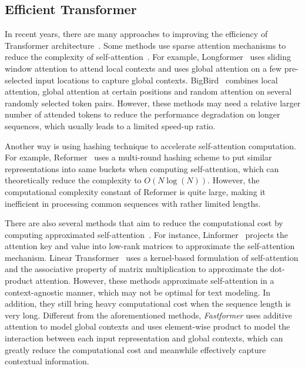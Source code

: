 \documentclass[11pt,a4paper]{article}
\begin{document}
\subsection{Efficient Transformer}

In recent years, there are many approaches to improving the efficiency of Transformer architecture~\cite{tay2020efficient}.
Some methods use sparse attention mechanisms to reduce the complexity of self-attention~\cite{child2019generating,beltagy2020longformer,zaheer2020big,zhang2021pooling}.
For example, Longformer~\cite{beltagy2020longformer} uses sliding window attention to attend local contexts and uses global attention on a few pre-selected input locations to capture global contexts.
BigBird~\cite{zaheer2020big} combines local attention, global attention at certain positions and random attention on several randomly selected token pairs.
However, these methods may need a relative larger  number of attended tokens to reduce the performance degradation on longer sequences, which usually leads to a limited speed-up ratio.

Another way is using hashing technique to accelerate self-attention computation.
For example, Reformer~\cite{Kitaev2020reformer} uses a multi-round hashing scheme to put similar representations into same buckets when computing self-attention, which can theoretically reduce the complexity to $O(N\log(N))$.
However, the computational complexity constant of Reformer is quite large, making it inefficient in processing common sequences with rather limited lengths.

There are also several methods that aim to reduce the computational cost by computing approximated  self-attention~\cite{choromanski2020masked,wang2020linformer,tay2021synthesizer}.
For instance, Linformer~\cite{wang2020linformer} projects the attention key and value into low-rank matrices to approximate the self-attention mechanism.
Linear Transformer~\cite{katharopoulos2020transformers} uses a kernel-based formulation of self-attention and the associative
property of matrix multiplication to approximate the dot-product attention.
However, these methods approximate self-attention in a context-agnostic manner, which may not be optimal for text modeling. 
In addition, they still bring heavy computational cost when the sequence length is very long.
Different from the aforementioned methods, \textit{Fastformer} uses additive attention to model global contexts and uses element-wise product to model the interaction between each input representation and global contexts, which can greatly reduce the computational cost and meanwhile effectively capture contextual information. 
 
\end{document}
